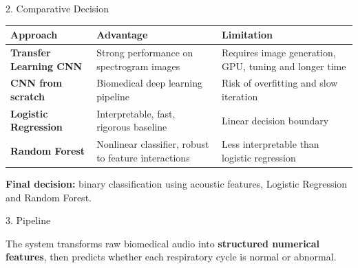 \documentclass[aspectratio=169]{beamer}
\newcommand{\important}[1]{\textcolor{YachayBlue}{\textbf{#1}}}
\begin{document}
\begin{frame}{2. Comparative Decision}
\small
\renewcommand{\arraystretch}{1.3}
\begin{tabularx}{\textwidth}{>{\bfseries}p{3.2cm} X X}
\toprule
\textbf{Approach} & \textbf{Advantage} & \textbf{Limitation} \\
\midrule
Transfer Learning CNN & Strong performance on spectrogram images & Requires image generation, GPU, tuning and longer time \\
CNN from scratch & Biomedical deep learning pipeline & Risk of overfitting and slow iteration \\
\important{Logistic Regression} & Interpretable, fast, rigorous baseline & Linear decision boundary \\
\important{Random Forest} & Nonlinear classifier, robust to feature interactions & Less interpretable than logistic regression \\
\bottomrule
\end{tabularx}

\vspace{0.35cm}
\centering
\important{Final decision:} binary classification using acoustic features, Logistic Regression and Random Forest.
\end{frame}

\begin{frame}{3. Pipeline}
\centering
{}

\vspace{0.45cm}
\small
The system transforms raw biomedical audio into \important{structured numerical features}, then predicts whether each respiratory cycle is normal or abnormal.
\end{frame}
\end{document}
